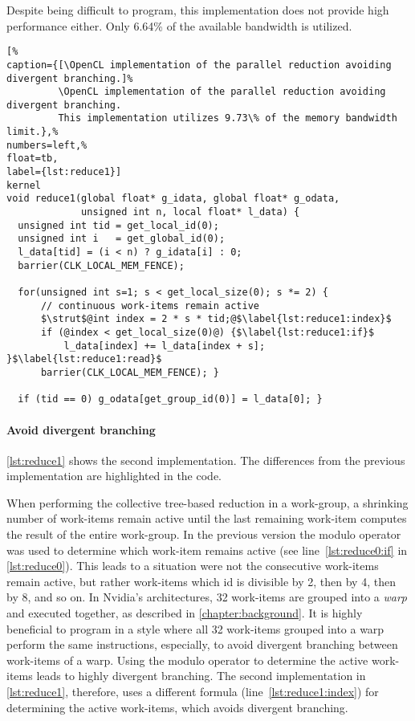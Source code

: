Despite being difficult to program, this implementation does not provide high performance either.
Only 6.64\% of the available bandwidth is utilized.

\begin{lstlisting}[%
caption={[\OpenCL implementation of the parallel reduction avoiding divergent branching.]%
         \OpenCL implementation of the parallel reduction avoiding divergent branching.
         This implementation utilizes 9.73\% of the memory bandwidth limit.},%
numbers=left,%
float=tb,
label={lst:reduce1}]
kernel
void reduce1(global float* g_idata, global float* g_odata,
             unsigned int n, local float* l_data) {
  unsigned int tid = get_local_id(0);
  unsigned int i   = get_global_id(0);
  l_data[tid] = (i < n) ? g_idata[i] : 0;
  barrier(CLK_LOCAL_MEM_FENCE);

  for(unsigned int s=1; s < get_local_size(0); s *= 2) {
      // continuous work-items remain active
      $\strut$@int index = 2 * s * tid;@$\label{lst:reduce1:index}$
      if (@index < get_local_size(0)@) {$\label{lst:reduce1:if}$
          l_data[index] += l_data[index + s]; }$\label{lst:reduce1:read}$
      barrier(CLK_LOCAL_MEM_FENCE); }

  if (tid == 0) g_odata[get_group_id(0)] = l_data[0]; }
\end{lstlisting}

\paragraph{Avoid divergent branching}

\autoref{lst:reduce1} shows the second implementation.
The differences from the previous implementation are highlighted in the code.

When performing the collective tree-based reduction in a work-group, a shrinking number of work-items remain active until the last remaining work-item computes the result of the entire work-group.
In the previous version the modulo operator was used to determine which work-item remains active (see line~\ref{lst:reduce0:if} in \autoref{lst:reduce0}).
This leads to a situation were not the consecutive work-items remain active, but rather work-items which id is divisible by 2, then by 4, then by 8, and so on.
In Nvidia's \GPU architectures, 32 work-items are grouped into a \emph{warp} and executed together, as described in \autoref{chapter:background}.
It is highly beneficial to program in a style where all 32 work-items grouped into a warp perform the same instructions, especially, to avoid divergent branching between work-items of a warp.
Using the modulo operator to determine the active work-items leads to highly divergent branching.
The second implementation in \autoref{lst:reduce1}, therefore, uses a different formula (line~\ref{lst:reduce1:index}) for determining the active work-items, which avoids divergent branching.


